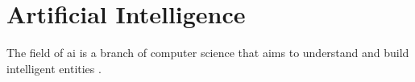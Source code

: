 \section{Artificial Intelligence}
\label{sec:theoretical_background:ai}

The field of \acrlong{ai} is a branch of computer science that aims to understand and build intelligent entities \cite[p.~1--18]{ai}. %
